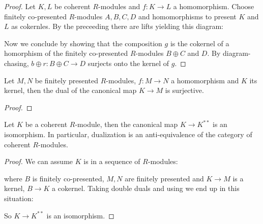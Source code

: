 \begin{proof}
  Let $K,L$ be coherent $R$-modules and $f:K\to L$ a homomorphism.
  Choose finitely co-presented $R$-modules $A,B,C,D$ and homomorphisms to present $K$ and $L$ as cokernles.
  By the preceeding  there are lifts yielding this diagram:
  \begin{center}
  \end{center}
  Now we conclude by showing that the composition $g$ is the cokernel of a homorphism of the finitely co-presented $R$-modules $B\oplus C$ and $D$.
  By diagram-chasing, $b\oplus r:B\oplus C\to D$ surjects onto the kernel of $g$.
\end{proof}

\begin{lemma}
  \label{fp-kernel-dual-surjective}
  Let $M,N$ be finitely presented $R$-modules, $f:M\to N$ a homomorphism and $K$ its kernel,
  then the dual of the canonical map $K\to M$ is surjective.
\end{lemma}

\begin{proof}
\end{proof}

\begin{theorem}
  \label{coherent-self-dual}
  Let $K$ be a coherent $R$-module, then the canonical map $K\to K^{\ast\ast}$ is an isomorphism.
  In particular, dualization is an anti-equivalence of the category of coherent $R$-modules.
\end{theorem}

\begin{proof}
  We can assume $K$ is in a sequence of $R$-modules:
  \begin{center}
  \end{center}
  where $B$ is finitely co-presented, $M,N$ are finitely presented and $K\to M$ is a kernel, $B\to K$ a cokernel.
  Taking double duals and using  we end up in this situation:
  \begin{center}
  \end{center}
  So $K\to K^{\ast\ast}$ is an isomorphism.
\end{proof}

